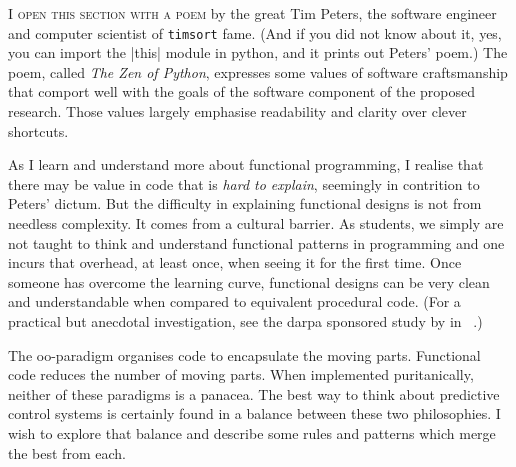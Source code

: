 \noindent\textsc{I open this section with a poem} by the great Tim Peters, the
software engineer and computer scientist of \texttt{timsort} fame. (And if you did not know about it, yes, you
can import the |this| module in python, and it prints out Peters' poem.) The
poem, called \emph{The Zen of Python}, expresses some values of software
craftsmanship that comport well with the goals of the software component of the
proposed research. Those values largely emphasise readability and clarity over
clever shortcuts.

As I learn and understand more about functional programming, I realise that
there may be value in code that is \emph{hard to explain}, seemingly in
contrition to Peters' dictum. But the difficulty in explaining functional
designs is not from needless complexity. It comes from a cultural barrier. As
students, we simply are not taught to think and understand functional patterns
in programming and one incurs that overhead, at least once, when seeing it for
the first time. Once someone has overcome the learning curve, functional designs
can be very clean and understandable when compared to equivalent procedural
code. (For a practical but anecdotal investigation, see the \ac{darpa} sponsored
study by \citeauthor{Haskell-vs-ada} in
~\cite{Haskell-vs-ada}.)

The \ac{oo}-paradigm organises code to encapsulate the moving parts. Functional
code reduces the number of moving parts. When implemented puritanically, neither
of these paradigms is a panacea. The best way to think about predictive control
systems is certainly found in a balance between these two philosophies. I wish
to explore that balance and describe some rules and patterns which merge the
best from each.

